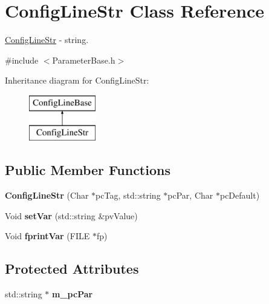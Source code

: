 \hypertarget{class_config_line_str}{}\section{Config\+Line\+Str Class Reference}
\label{class_config_line_str}


\hyperlink{class_config_line_str}{Config\+Line\+Str} -\/ string.  




{\ttfamily \#include $<$Parameter\+Base.\+h$>$}

Inheritance diagram for Config\+Line\+Str\+:\begin{figure}[H]
\begin{center}
\leavevmode
\includegraphics[height=2.000000cm]{class_config_line_str}
\end{center}
\end{figure}
\subsection*{Public Member Functions}
\begin{DoxyCompactItemize}
\item 
\mbox{\label{class_config_line_str_a0d78882f2ce3e7474aff5a39677a706a}} 
{\bfseries Config\+Line\+Str} (Char $\ast$pc\+Tag, std\+::string $\ast$pc\+Par, Char $\ast$pc\+Default)
\item 
\mbox{\label{class_config_line_str_a513b0f223d8ee74863c03c0e4741968c}} 
Void {\bfseries set\+Var} (std\+::string \&pv\+Value)
\item 
\mbox{\label{class_config_line_str_a0356b0e3f2e7fef3e290f4eb7b1950d6}} 
Void {\bfseries fprint\+Var} (F\+I\+LE $\ast$fp)
\end{DoxyCompactItemize}
\subsection*{Protected Attributes}
\begin{DoxyCompactItemize}
\item 
\mbox{\label{class_config_line_str_acac7a95f4ae1e49073b689743e5175cd}} 
std\+::string $\ast$ {\bfseries m\+\_\+pc\+Par}
\end{DoxyCompactItemize}
